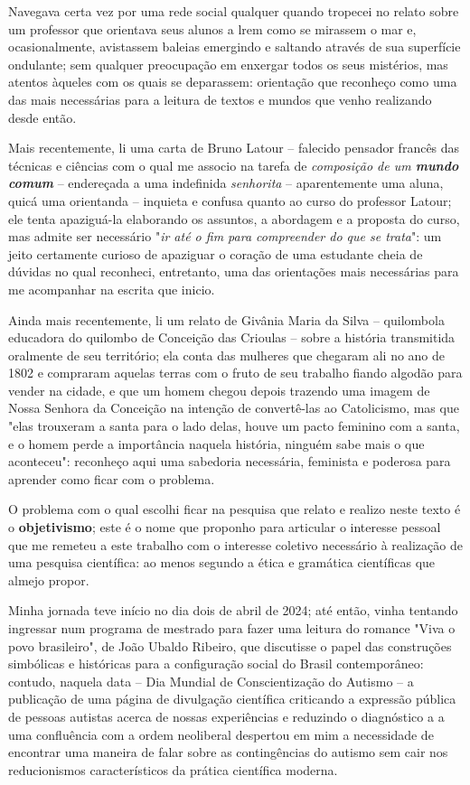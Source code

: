 Navegava certa vez por uma rede social qualquer quando tropecei no relato sobre um professor que orientava seus alunos a lrem como se mirassem o mar e, ocasionalmente, avistassem baleias emergindo e saltando através de sua superfície ondulante;
    sem qualquer preocupação em enxergar todos os seus mistérios, mas atentos àqueles com os quais se deparassem:
        orientação que reconheço como uma das mais necessárias para a leitura de textos e mundos que venho realizando desde então.

Mais recentemente, li uma carta de Bruno Latour -- falecido pensador francês das técnicas e ciências com o qual me associo na tarefa de \textit{composição de um \textbf{mundo comum}} -- endereçada a uma indefinida \textit{senhorita} -- aparentemente uma aluna, quicá uma orientanda -- inquieta e confusa quanto ao curso do professor Latour;
    ele tenta apaziguá-la elaborando os assuntos, a abordagem e a proposta do curso, mas admite ser necessário "\textit{ir até o fim para compreender do que se trata}":
        um jeito certamente curioso de apaziguar o coração de uma estudante cheia de dúvidas no qual reconheci, entretanto, uma das orientações mais necessárias para me acompanhar na escrita que inicio.

Ainda mais recentemente, li um relato de Givânia Maria da Silva -- quilombola educadora do quilombo de Conceição das Crioulas -- sobre a história transmitida oralmente de seu território;
    ela conta das mulheres que chegaram ali no ano de 1802 e compraram aquelas terras com o fruto de seu trabalho fiando algodão para vender na cidade, e que um homem chegou depois trazendo uma imagem de Nossa Senhora da Conceição na intenção de convertê-las ao Catolicismo, mas que "elas trouxeram a santa para o lado delas, houve um pacto feminino com a santa, e o homem perde a importância naquela história, ninguém sabe mais o que aconteceu":
        reconheço aqui uma sabedoria necessária, feminista e poderosa para aprender como ficar com o problema.

O problema com o qual escolhi ficar na pesquisa que relato e realizo neste texto é o \textbf{objetivismo};
    este é o nome que proponho para articular o interesse pessoal que me remeteu a este trabalho com o interesse coletivo necessário à realização de uma pesquisa científica:
        ao menos segundo a ética e gramática científicas que almejo propor.

Minha jornada teve início no dia dois de abril de 2024;
    até então, vinha tentando ingressar num programa de mestrado para fazer uma leitura do romance "Viva o povo brasileiro", de João Ubaldo Ribeiro, que discutisse o papel das construções simbólicas e históricas para a configuração social do Brasil contemporâneo:
        contudo, naquela data -- Dia Mundial de Conscientização do Autismo -- a publicação de uma página de divulgação científica criticando a expressão pública de pessoas autistas acerca de nossas experiências e reduzindo o diagnóstico a a uma confluência com a ordem neoliberal despertou em mim a necessidade de encontrar uma maneira de falar sobre as contingências do autismo sem cair nos reducionismos característicos da prática científica moderna.

